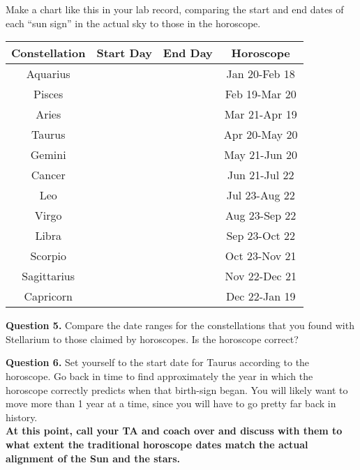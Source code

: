\documentclass[11pt]{article}
\begin{document}
Make a chart like this in your lab record, comparing the start and end dates of each ``sun sign'' in the actual sky to those in the horoscope.

\begin{center}
	\begin{tabular}{|c|c|c|c|}
		\hline
		Constellation&Start Day&End Day&Horoscope\\ \hline
		Aquarius    & & &Jan 20-Feb 18\\ \hline
		Pisces      & & &Feb 19-Mar 20\\ \hline
		Aries       & & &Mar 21-Apr 19\\ \hline
		Taurus      & & &Apr 20-May 20\\ \hline
		Gemini      & & &May 21-Jun 20\\ \hline
		Cancer      & & &Jun 21-Jul 22\\ \hline
		Leo         & & &Jul 23-Aug 22\\ \hline	
		Virgo       & & &Aug 23-Sep 22\\ \hline
		Libra       & & &Sep 23-Oct 22\\ \hline
		Scorpio     & & &Oct 23-Nov 21\\ \hline
		Sagittarius & & &Nov 22-Dec 21\\ \hline
		Capricorn   & & &Dec 22-Jan 19\\
		\hline
	\end{tabular}
\end{center}

\textbf{Question 5.} Compare the date ranges for the constellations that you found with Stellarium to those claimed by horoscopes. Is the horoscope correct?\\

\vspace{1.5cm}

\textbf{Question 6.} Set yourself to the start date for Taurus according to the horoscope. Go back in time to find approximately the year in which the horoscope correctly predicts when that birth-sign began. You will likely want to move more than 1 year at a time, since you will have to go pretty far back in history.\\


\bf At this point, call your TA and coach over and discuss with them to what extent the traditional horoscope dates match the actual alignment of the Sun and the stars.
\rm



\vspace{1.5cm}
\hrulefill\\
\end{document}
